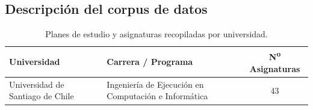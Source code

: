 \subsection{Descripción del corpus de datos}
\label{app:corpus}
 \begin{table}[H]
        \centering
        \small
        \renewcommand{\baselinestretch}{1.0}\selectfont
        \caption{Planes de estudio y asignaturas recopiladas por universidad.}
        \label{tab:corpus_universidades}
        \captionsetup{skip=8pt}                                                                                              
                                                                                                                             
        \setcounter{contadorFilas}{0}
        
        \newcommand{\finFila}{%
          \stepcounter{contadorFilas}%
          \\ \hline%
        }
        
        \begin{tabularx}{\textwidth}{>{\raggedright\arraybackslash}X >{\raggedright\arraybackslash}X c}                                                                              
            \toprule                                                                                                         
            \textbf{Universidad} &                                                                                           
            \textbf{Carrera / Programa} &                                                                                    
            \textbf{N\textsuperscript{o} Asignaturas} \\                                                                                    
            \midrule                                                                                                         
                                                                                                                             
            Universidad de Santiago de Chile &                                                                               
            Ingeniería de Ejecución en Computación e Informática &                                                                                
            43 \finFila                                                                                       
                                                                                                                             

\end{tabularx}
\end{table}
